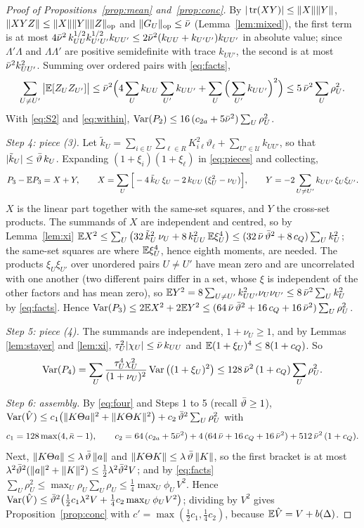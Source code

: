 \begin{proof}[Proof of Propositions~\ref{prop:mean} and~\ref{prop:conc}]
By $|\operatorname{tr}(XY)|\le\|X\|\|Y\|$, $\|XYZ\|\le\|X\|\|Y\|\|Z\|_{\mathrm{op}}$ and $\|G_U\|_{\mathrm{op}}\le\bar\nu$
(Lemma~\ref{lem:mixed}), the first term is at most
$4\bar\nu^2\,k_{UU}^{1/2}k_{U'U'}^{1/2}k_{UU'}\le2\bar\nu^2(k_{UU}+k_{U'U'})k_{UU'}$ in absolute value; since
$\Lambda'\Lambda$ and $\Lambda\Lambda'$ are positive semidefinite with trace $k_{UU'}$, the second is at most
$\bar\nu^2k_{UU'}^2$. Summing over ordered pairs with
\eqref{eq:facts},
\[
\sum_{U\ne U'}\big|\mathbb{E}[Z_UZ_{U'}]\big|\le\bar\nu^2\Big(4\sum_Uk_{UU}\sum_{U'}k_{UU'}+\sum_U\Big(\sum_{U'}k_{UU'}\Big)^2\Big)
\le5\,\bar\nu^2\sum_U\rho_U^2 .
\]
With \eqref{eq:S2} and \eqref{eq:within}, $\operatorname{Var}(P_2)\le16\,(c_{2a}+5\bar\nu^2)\sum_U\rho_U^2$.

\medskip\noindent\emph{Step 4: piece (3).} Let
$\tilde k_U=\sum_{i\in U}\sum_{\ell\in R}K_{i\ell}^2\vartheta_\ell+\sum_{U'\in\mathcal{U}}k_{UU'}$, so that
$|\tilde k_U|\le\bar\vartheta\,k_U$. Expanding $(1+\xi_i)(1+\xi_\ell)$ in \eqref{eq:pieces} and collecting,
\[
P_3-\mathbb{E} P_3=X+Y,\qquad X=\sum_U\Big[-4\,\tilde k_U\,\xi_U-2\,k_{UU}\,(\xi_U^2-\nu_U)\Big],\qquad
Y=-2\sum_{U\ne U'}k_{UU'}\,\xi_U\xi_{U'} .
\]
$X$ is the linear part together with the same-set squares, and $Y$ the cross-set products. The summands of $X$ are independent and centred, so by Lemma~\ref{lem:xi}
$\mathbb{E} X^2\le\sum_U\big(32\,\tilde k_U^2\,\nu_U+8\,k_{UU}^2\,\mathbb{E}\xi_U^4\big)\le(32\,\bar\nu\,\bar\vartheta^2+8\,c_Q)\sum_Uk_U^2$;
the same-set squares are where $\mathbb{E}\xi_U^4$, hence eighth moments, are needed. The products
$\xi_U\xi_{U'}$ over unordered pairs $U\ne U'$ have mean zero and are uncorrelated with one another
(two different pairs differ in a set, whose $\xi$ is independent of the other factors and has mean zero), so
$\mathbb{E} Y^2=8\sum_{U\ne U'}k_{UU'}^2\nu_U\nu_{U'}\le8\,\bar\nu^2\sum_Uk_U^2$ by \eqref{eq:facts}. Hence
$\operatorname{Var}(P_3)\le2\mathbb{E} X^2+2\mathbb{E} Y^2\le(64\,\bar\nu\,\bar\vartheta^2+16\,c_Q+16\,\bar\nu^2)\sum_U\rho_U^2$.

\medskip\noindent\emph{Step 5: piece (4).} The summands are independent, $1+\nu_U\ge1$, and by
Lemmas \ref{lem:stayer} and \ref{lem:xi}, $\tau_U^2|\chi_U|\le\bar\nu\,k_{UU}$ and $\mathbb{E}(1+\xi_U)^4\le8(1+c_Q)$. So
\[
\operatorname{Var}(P_4)=\sum_U\frac{\tau_U^4\chi_U^2}{(1+\nu_U)^2}\operatorname{Var}\big((1+\xi_U)^2\big)\le128\,\bar\nu^2\,(1+c_Q)\sum_U\rho_U^2 .
\]

\medskip\noindent\emph{Step 6: assembly.} By \eqref{eq:four} and Steps 1 to 5 (recall $\bar\vartheta\ge1$),
$\operatorname{Var}(\hat V)\le c_1\big(\|K\Theta a\|^2+\|K\Theta K\|^2\big)+c_2\,\bar\vartheta^2\sum_U\rho_U^2$ with
\[
c_1=128\max(4,\bar\kappa-1),\qquad
c_2=64\,(c_{2a}+5\bar\nu^2)+4\,(64\,\bar\nu+16\,c_Q+16\,\bar\nu^2)+512\,\bar\nu^2\,(1+c_Q).
\]
Next, $\|K\Theta a\|\le\lambda\,\bar\vartheta\,\|a\|$ and
$\|K\Theta K\|\le\lambda\,\bar\vartheta\,\|K\|$, so the first bracket is at most
$\lambda^2\bar\vartheta^2(\|a\|^2+\|K\|^2)\le\frac12\lambda^2\bar\vartheta^2V$; and by \eqref{eq:facts}
$\sum_U\rho_U^2\le\max_U\rho_U\sum_U\rho_U\le\frac14\max_U\phi_U\,V^2$. Hence
$\operatorname{Var}(\hat V)\le\bar\vartheta^2\big(\frac12c_1\lambda^2V+\frac14c_2\max_U\phi_UV^2\big)$; dividing by $V^2$ gives
Proposition~\ref{prop:conc} with $c'=\max(\frac12c_1,\frac14c_2)$, because $\mathbb{E}\hat V=V+b(\Delta)$.
\end{proof}

